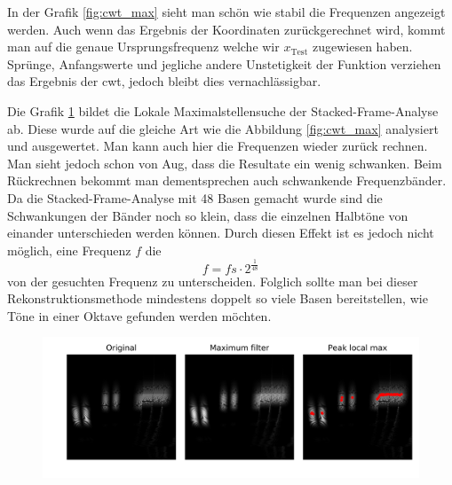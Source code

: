 In der Grafik \ref{fig:cwt_max} sieht man schön wie stabil die Frequenzen angezeigt werden. Auch wenn das Ergebnis der Koordinaten zurückgerechnet wird, kommt man auf die genaue Ursprungsfrequenz welche wir $x_{\text{Test}}$ zugewiesen haben. Sprünge, Anfangswerte und jegliche andere Unstetigkeit der Funktion verziehen das Ergebnis der cwt, jedoch bleibt dies vernachlässigbar.


Die Grafik \ref{fig:stacked_max} bildet die Lokale Maximalstellensuche der Stacked-Frame-Analyse ab. Diese wurde auf die gleiche Art wie die Abbildung \ref{fig:cwt_max} analysiert und ausgewertet. Man kann auch hier die Frequenzen wieder zurück rechnen. Man sieht jedoch schon von Aug, dass die Resultate ein wenig schwanken. Beim Rückrechnen bekommt man dementsprechen auch schwankende Frequenzbänder. Da die Stacked-Frame-Analyse mit 48 Basen gemacht wurde sind die Schwankungen der Bänder noch so klein, dass die einzelnen Halbtöne von einander unterschieden werden können. Durch diesen Effekt ist es jedoch nicht möglich, eine Frequenz $f$ die 
\[f= fs\cdot 2^{\frac{1}{48}}\]  
von der gesuchten Frequenz zu unterscheiden. Folglich sollte man bei dieser Rekonstruktionsmethode mindestens doppelt so viele Basen bereitstellen, wie Töne in einer Oktave gefunden werden möchten. 
\begin{figure}[!ht]
	\centering
	\includegraphics[width=\linewidth]{papers/autotune/sections/frames/images/Stacked/dwtmaxima.jpg}
	\label{fig:stacked_max}
\end{figure}%



